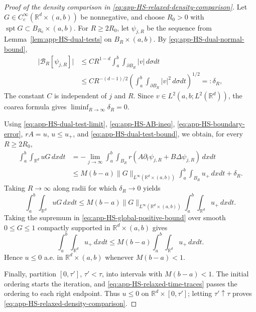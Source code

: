 \documentclass[11pt]{amsart}
\numberwithin{equation}{section}
\numberwithin{figure}{section}
\theoremstyle{plain}
\theoremstyle{definition}
\theoremstyle{remark}
\theoremstyle{plain}
\newcommand{\abs}[1]{\lvert #1 \rvert}
\newcommand{\norm}[1]{\lVert #1 \rVert}
\newcommand{\supp}{\operatorname{spt}}
\def\R{\mathbb{R}}
\begin{document}
\begin{proof}[Proof of the density comparison in \eqref{eq:app-HS-relaxed-density-comparison}]
Let \(G\in C_c^\infty(\R^d\times(a,b))\) be nonnegative, and choose
\(R_0>0\) with \(\supp G\subset B_{R_0}\times(a,b)\).  For
\(R\geq2R_0\), let \(\psi_{j,R}\) be the sequence from
Lemma~\ref{lem:app-HS-dual-tests} on \(B_R\times(a,b)\).  By
\eqref{eq:app-HS-dual-normal-bound},
\begin{equation}\label{eq:app-HS-boundary-error}
\begin{aligned}
    \abs{\mathcal B_R[\psi_{j,R}]}
    &\leq
    C R^{1-d}\int_a^b\!\!\int_{\partial B_R}\abs{v}\,d\sigma dt  \\
    &\leq
    C R^{-(d-1)/2}
    \left(\int_a^b\!\!\int_{\partial B_R}\abs{v}^2\,d\sigma dt\right)^{1/2}
    =:\delta_R ,
\end{aligned}
\end{equation}
The constant \(C\) is independent of \(j\) and \(R\).  Since
\(v\in L^2(a,b;L^2(\R^d))\), the coarea formula gives
\(\liminf_{R\to\infty}\delta_R=0\).

Using \eqref{eq:app-HS-dual-test-limit}, \eqref{eq:app-HS-AB-ineq},
\eqref{eq:app-HS-boundary-error}, \(rA=u\), \(u\leq u_+\), and
\eqref{eq:app-HS-dual-test-bound}, we obtain, for every \(R\geq2R_0\),
\begin{equation}\label{eq:app-HS-local-positive-bound}
\begin{aligned}
    \int_a^b\!\!\int_{\R^d} uG\,dxdt
    &=
    -\lim_{j\to\infty}
    \int_a^b\!\!\int_{B_R}
    r\left(A\partial_t\psi_{j,R}+B\Delta\psi_{j,R}\right)\,dxdt \\
    &\leq
    M(b-a)\norm{G}_{L^\infty(\R^d\times(a,b))}
    \int_a^b\!\!\int_{B_R} u_+\,dxdt
    +\delta_R .
\end{aligned}
\end{equation}
Taking \(R\to\infty\) along radii for which \(\delta_R\to0\) yields
\begin{equation}\label{eq:app-HS-global-positive-bound}
    \int_a^b\!\!\int_{\R^d} uG\,dxdt
    \leq
    M(b-a)\norm{G}_{L^\infty(\R^d\times(a,b))}
    \int_a^b\!\!\int_{\R^d} u_+\,dxdt .
\end{equation}
Taking the supremum in \eqref{eq:app-HS-global-positive-bound} over smooth
\(0\leq G\leq1\) compactly supported in \(\R^d\times(a,b)\) gives
\[
    \int_a^b\!\!\int_{\R^d} u_+\,dxdt
    \leq
    M(b-a)\int_a^b\!\!\int_{\R^d} u_+\,dxdt.
\]
Hence \(u\leq0\) a.e. in \(\R^d\times(a,b)\) whenever \(M(b-a)<1\).

Finally, partition \([0,\tau']\), \(\tau'<\tau\), into intervals
with \(M(b-a)<1\). The initial ordering starts the iteration, and
\eqref{eq:app-HS-relaxed-time-traces} passes the ordering to each right
endpoint. Thus \(u\leq0\) on \(\R^d\times[0,\tau']\); letting
\(\tau'\uparrow\tau\) proves \eqref{eq:app-HS-relaxed-density-comparison}.
\end{proof}
\end{document}
